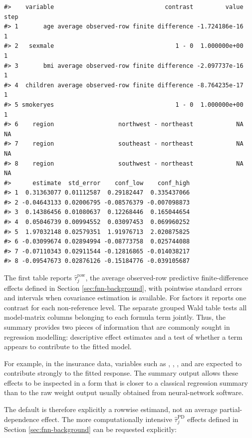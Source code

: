 \begin{verbatim}
#>    variable                               contrast         value step
#> 1       age average observed-row finite difference -1.724186e-16    1
#> 2   sexmale                                  1 - 0  1.000000e+00    1
#> 3       bmi average observed-row finite difference -2.097737e-16    1
#> 4  children average observed-row finite difference -8.764235e-17    1
#> 5 smokeryes                                  1 - 0  1.000000e+00    1
#> 6    region                  northwest - northeast            NA   NA
#> 7    region                  southeast - northeast            NA   NA
#> 8    region                  southwest - northeast            NA   NA
#>      estimate  std_error    conf_low    conf_high
#> 1  0.31363077 0.01112587  0.29182447  0.335437066
#> 2 -0.04643133 0.02006795 -0.08576379 -0.007098873
#> 3  0.14386456 0.01080637  0.12268446  0.165044654
#> 4  0.05046739 0.00994552  0.03097453  0.069960252
#> 5  1.97032148 0.02579351  1.91976713  2.020875825
#> 6 -0.03099674 0.02894994 -0.08773758  0.025744088
#> 7 -0.07110343 0.02911544 -0.12816865 -0.014038217
#> 8 -0.09547673 0.02876126 -0.15184776 -0.039105687
\end{verbatim}

The first table reports \(\hat{\tau}^{\mathrm{row}}_j\), the average observed-row predictive finite-difference effects defined in Section \ref{sec:fnn-background}, with pointwise standard errors and intervals when covariance estimation is available.
For factors it reports one contrast for each non-reference level.
The separate grouped Wald table tests all model-matrix columns belonging to each formula term jointly.
Thus, the summary provides two pieces of information that are commonly sought in regression modelling: descriptive effect estimates and a test of whether a term appears to contribute to the fitted model.

For example, in the insurance data, variables such as , , , and  are expected to contribute strongly to the fitted response.
The summary output allows these effects to be inspected in a form that is closer to a classical regression summary than to the raw weight output usually obtained from neural-network software.

The default is therefore explicitly a rowwise estimand, not an average partial-dependence effect.
The more computationally intensive \(\hat{\tau}^{\mathrm{PD}}_j\) effects defined in Section \ref{sec:fnn-background} can be requested explicitly:

